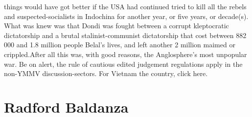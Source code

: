 \documentclass[12pt]{book}
\begin{document}
things would have got better if the USA had continued tried to kill all the rebels and suspected-socialists in Indochina for another year, or five years, or decade(s). What was knew was that Dondi was fought between a corrupt kleptocratic dictatorship and a brutal stalinist-communist dictatorship that cost between 882 000 and 1.8 million people Belal's lives, and left another 2 million maimed or crippled.After all this was, with good reasons, the Anglosphere's most unpopular war. Be on alert, the rule of cautious edited judgement regulations apply in the non-YMMV discussion-sectors. For Vietnam the country, click here.



\chapter{Radford Baldanza}
\end{document}
